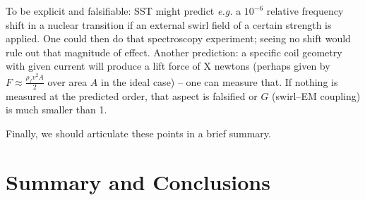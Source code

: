\documentclass[11pt]{article}
\begin{document}
To be explicit and falsifiable: SST might predict \textit{e.g.} a $10^{-6}$ relative frequency shift in a nuclear transition if an external swirl field of a certain strength is applied. One could then do that spectroscopy experiment; seeing no shift would rule out that magnitude of effect. Another prediction: a specific coil geometry with given current will produce a lift force of X newtons (perhaps given by $F \approx \frac{\rho_f v^2 A}{2}$ over area $A$ in the ideal case) – one can measure that. If nothing is measured at the predicted order, that aspect is falsified or $G$ (swirl–EM coupling) is much smaller than 1.


Finally, we should articulate these points in a brief summary.


\section*{Summary and Conclusions}
\end{document}
